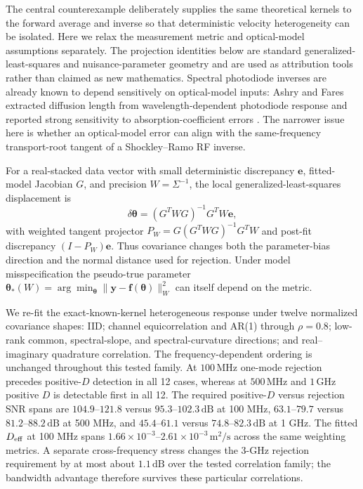 \documentclass[aps,pra,twocolumn,superscriptaddress,nofootinbib]{revtex4-2}
\begin{document}
The central counterexample deliberately supplies the same theoretical kernels to the forward average and inverse so that deterministic velocity heterogeneity can be isolated. Here we relax the measurement metric and optical-model assumptions separately. The projection identities below are standard generalized-least-squares and nuisance-parameter geometry and are used as attribution tools rather than claimed as new mathematics. Spectral photodiode inverses are already known to depend sensitively on optical-model inputs: Ashry and Fares extracted diffusion length from wavelength-dependent photodiode response and reported strong sensitivity to absorption-coefficient errors \cite{ashry2003diffusion}. The narrower issue here is whether an optical-model error can align with the same-frequency transport-root tangent of a Shockley--Ramo RF inverse.

For a real-stacked data vector with small deterministic discrepancy $\bm e$, fitted-model Jacobian $G$, and precision $W=\Sigma^{-1}$, the local generalized-least-squares displacement is
\begin{equation}
\boxed{\delta\bm\theta=(G^T W G)^{-1}G^T W\bm e},
\label{eq:generalbias}
\end{equation}
with weighted tangent projector $P_W=G(G^T W G)^{-1}G^T W$ and post-fit discrepancy $(I-P_W)\bm e$. Thus covariance changes both the parameter-bias direction and the normal distance used for rejection. Under model misspecification the pseudo-true parameter $\bm\theta_*(W)=\arg\min_{\bm\theta}\|\bm y-\bm f(\bm\theta)\|_W^2$ can itself depend on the metric.

We re-fit the exact-known-kernel heterogeneous response under twelve normalized covariance shapes: IID; channel equicorrelation and AR(1) through $\rho=0.8$; low-rank common, spectral-slope, and spectral-curvature directions; and real--imaginary quadrature correlation. The frequency-dependent ordering is unchanged throughout this tested family. At $100\,\mathrm{MHz}$ one-mode rejection precedes positive-$D$ detection in all 12 cases, whereas at $500\,\mathrm{MHz}$ and $1\,\mathrm{GHz}$ positive $D$ is detectable first in all 12. The required positive-$D$ versus rejection SNR spans are $104.9$--$121.8$ versus $95.3$--$102.3\,\mathrm{dB}$ at 100 MHz, $63.1$--$79.7$ versus $81.2$--$88.2\,\mathrm{dB}$ at 500 MHz, and $45.4$--$61.1$ versus $74.8$--$82.3\,\mathrm{dB}$ at 1 GHz. The fitted $D_{\rm eff}$ at 100 MHz spans $1.66\times10^{-3}$--$2.61\times10^{-3}\,\mathrm{m^2/s}$ across the same weighting metrics. A separate cross-frequency stress changes the 3-GHz rejection requirement by at most about $1.1\,\mathrm{dB}$ over the tested correlation family; the bandwidth advantage therefore survives these particular correlations.
\end{document}
